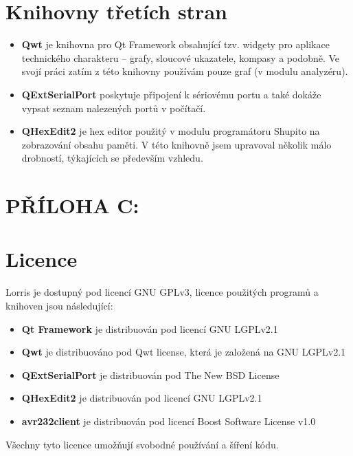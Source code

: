 \documentclass[12pt, a4paper, oneside]{article}
\begin{document}
\section*{Knihovny třetích stran}
\begin{itemize}
    \item {\bf Qwt}\cite{qwt} je knihovna pro Qt Framework obsahující tzv. widgety pro aplikace technického charakteru -- grafy, sloucové ukazatele, kompasy a podobně. Ve svojí práci zatím z této knihovny používám pouze graf (v modulu analyzéru).
    \item {\bf QExtSerialPort}\cite{qext} poskytuje připojení k sériovému portu a také dokáže vypsat seznam nalezených portů v počítačí.
    \item {\bf QHexEdit2}\cite{qhex} je hex editor použitý v modulu programátoru Shupito na zobrazování obsahu paměti. V této knihovně jsem upravoval několik málo drobností, týkajících se především vzhledu.
\end{itemize}

\section*{PŘÍLOHA C:}
\section*{Licence}
Lorris je dostupný pod licencí GNU GPLv3\cite{gpl3}, licence použitých programů a knihoven jsou následující:
\begin{itemize}
    \item {\bf Qt Framework} je distribuován pod licencí GNU LGPLv2.1\cite{lgpl}
    \item {\bf Qwt} je distribuováno pod Qwt license\cite{qwtlicense}, která je založená na GNU LGPLv2.1
    \item {\bf QExtSerialPort} je distribuován pod The New BSD License\cite{newbsd}
    \item {\bf QHexEdit2} je distribuován pod licencí GNU LGPLv2.1
    \item {\bf avr232client} je distribuován pod licencí Boost Software License v1.0\cite{boost}
\end{itemize}

Všechny tyto licence umožňují svobodné používání a šíření kódu.

\newpage
\end{document}

